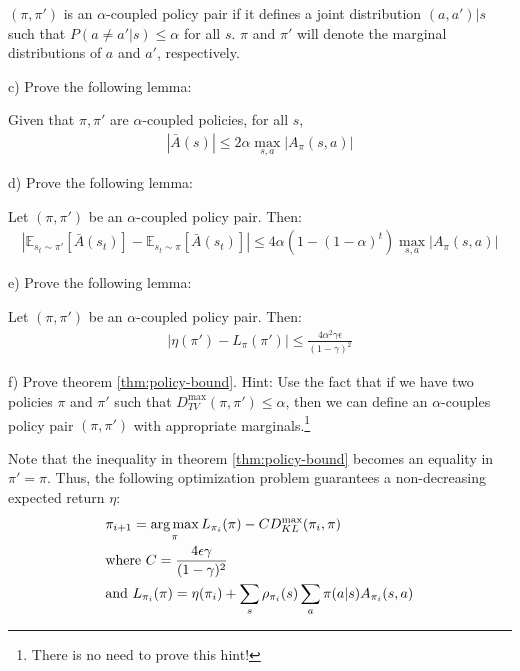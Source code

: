 \begin{definition}
    $(\pi, \pi')$ is an $\alpha$-coupled policy pair if it defines a joint distribution $(a, a')|s$ such that $P(a \neq a'|s) \le \alpha$ for all $s$. $\pi$ and $\pi'$ will denote the marginal distributions of $a$ and $a'$, respectively.
\end{definition}

c) Prove the following lemma:

\begin{lemma}
    Given that $\pi, \pi'$ are $\alpha$-coupled policies, for all $s$,
    \begin{align*}
        |\bar{A}(s)| \le 2\alpha \max_{s, a}|A_{\pi}(s,a)|
    \end{align*}
\end{lemma}

d) Prove the following lemma:

\begin{lemma}
    Let $(\pi, \pi')$ be an $\alpha$-coupled policy pair. Then:
    \begin{align*}
        |\mathbb{E}_{s_t \sim \pi'}[\bar{A}(s_t)] - \mathbb{E}_{s_t \sim \pi}[\bar{A}(s_t)]| \le 4\alpha(1-(1-\alpha)^t)\max_{s, a}|A_\pi(s, a)|
    \end{align*}
\end{lemma}

e) Prove the following lemma:

\begin{lemma}
    Let $(\pi, \pi')$ be an $\alpha$-coupled policy pair. Then:
    \begin{align*}
        |\eta(\pi')-L_{\pi}(\pi')| \le \frac{4\alpha^2\gamma\epsilon}{(1-\gamma)^2}
    \end{align*}
\end{lemma}

f) Prove theorem \ref{thm:policy-bound}. Hint: Use the fact that if we have two policies $\pi$ and $\pi'$ such that $D_{TV}^{\max} (\pi, \pi') \le \alpha$, then we can define an $\alpha$-couples policy pair $(\pi, \pi')$ with appropriate marginals.\footnote{There is no need to prove this hint!}


Note that the inequality in theorem \ref{thm:policy-bound} becomes an equality in $\pi' = \pi$. Thus, the following optimization problem guarantees a non-decreasing expected return $\eta$:
\begin{align*}
    &\pi_{i + 1} = \operatorname*{arg\,max}_{\pi} L_{\pi_i}(\pi) - CD_{KL}^{\max}(\pi_i, \pi)\\
    &\text{where } C = \frac{4\epsilon\gamma}{(1-\gamma)^2}\\
    &\text{and } L_{\pi_i}(\pi) = \eta(\pi_i) + \sum_{s}\rho_{\pi_i}(s)\sum_{a}\pi(a|s)A_{\pi_i}(s, a)
\end{align*}


